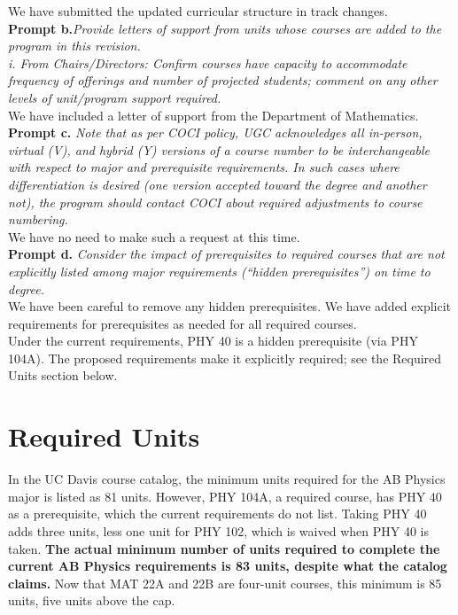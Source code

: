 \documentclass[12pt]{article}
\begin{document}
\noindent
We have submitted the updated curricular structure in track changes.\\[5pt]

\noindent
{\bf Prompt b.}{\it Provide letters of support from units whose courses are added to the program in this revision.}\\
{\it i. From Chairs/Directors: Confirm courses have capacity to accommodate frequency of offerings and number of projected students; comment on any other levels of unit/program support required.}\\[5pt]

\noindent
We have included a letter of support from the Department of Mathematics.\\[5pt]

\noindent
{\bf Prompt c.}  {\it Note that as per COCI policy, UGC acknowledges all in-person, virtual (V), and
  hybrid (Y) versions of a course number to be interchangeable with respect to major and
  prerequisite requirements. In such cases where differentiation is desired (one version accepted
  toward the degree and another not), the program should contact COCI about required adjustments to
  course numbering.}\\

\noindent
We have no need to make such a request at this time.\\[5pt]

\noindent
{\bf Prompt d.}
{\it Consider the impact of prerequisites to required courses that are not explicitly listed among major requirements (“hidden prerequisites”) on time to degree.}\\

\noindent
We have been careful to remove any hidden prerequisites.  We have added explicit requirements for
prerequisites as needed for all required courses.\\[5pt]

\noindent
Under the current requirements, PHY 40 is a hidden prerequisite (via
PHY 104A).  The proposed requirements make it explicitly required;
see the Required Units section below.

\section*{Required Units}

\noindent
In the UC Davis course catalog, the minimum units required for the AB
Physics major is listed as 81 units.  However, PHY 104A, a required
course, has PHY 40 as a prerequisite, which the current requirements
do not list.  Taking PHY 40 adds three units, less one unit for PHY
102, which is waived when PHY 40 is taken.  {\bf The actual minimum
  number of units required to complete the current AB Physics
  requirements is 83 units, despite what the catalog claims.}  Now that
MAT 22A and 22B are four-unit courses, this minimum is 85 units, five
units above the cap.\\[5pt]
\end{document}

